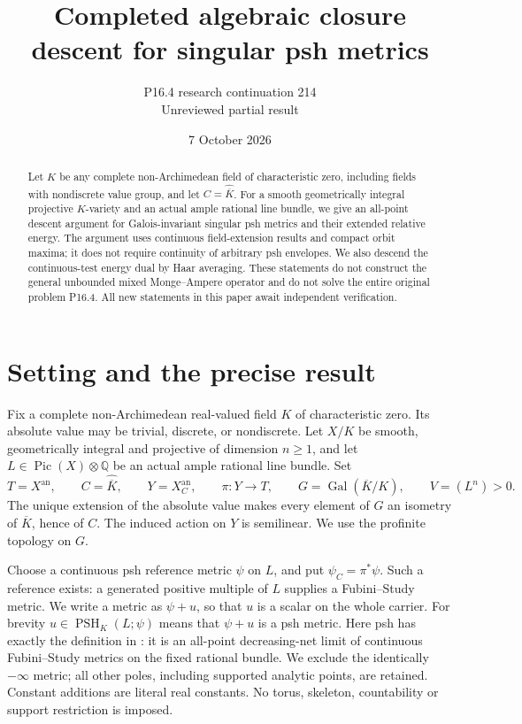 \documentclass[11pt]{article}
\title{Completed algebraic closure descent for singular psh metrics}
\author{P16.4 research continuation 214\\Unreviewed partial result}
\date{7 October 2026}
\theoremstyle{remark}
\newcommand{\PSH}{\operatorname{PSH}}
\newcommand{\an}{\mathrm{an}}
\newcommand{\Gal}{\operatorname{Gal}}
\begin{document}
\maketitle

\begin{abstract}
Let $K$ be any complete non-Archimedean field of characteristic zero,
including fields with nondiscrete value group, and let
$C=\widehat{\overline K}$. For a smooth geometrically integral projective
$K$-variety and an actual ample rational line bundle, we give an
all-point descent argument for Galois-invariant singular psh metrics
and their extended relative energy. The argument uses continuous
field-extension results and compact orbit maxima; it does not require
continuity of arbitrary psh envelopes. We also descend the
continuous-test energy dual by Haar averaging. These statements do not
construct the general unbounded mixed Monge--Ampere operator and do
not solve the entire original problem P16.4. All new statements in this
paper await independent verification.
\end{abstract}

\section{Setting and the precise result}

Fix a complete non-Archimedean real-valued field $K$ of characteristic
zero. Its absolute value may be trivial, discrete, or nondiscrete.
Let $X/K$ be smooth, geometrically integral and projective of dimension
$n\geq 1$, and let $L\in\operatorname{Pic}(X)\otimes\mathbb Q$ be an
actual ample rational line bundle. Set
\[
 T=X^{\an},\qquad C=\widehat{\overline K},\qquad
 Y=X_C^{\an},\qquad \pi:Y\longrightarrow T,\qquad
 G=\Gal(\overline K/K),\qquad V=(L^n)>0.
\]
The unique extension of the absolute value makes every element of $G$
an isometry of $\overline K$, hence of $C$. The induced action on $Y$
is semilinear. We use the profinite topology on $G$.

Choose a continuous psh reference metric $\psi$ on $L$, and put
$\psi_C=\pi^*\psi$. Such a reference exists: a generated positive
multiple of $L$ supplies a Fubini--Study metric. We write a metric as
$\psi+u$, so that $u$ is a scalar on the whole carrier. For brevity
$u\in\PSH_K(L;\psi)$ means that $\psi+u$ is a psh metric.
Here psh has exactly the definition in \cite[Definition 7.2]{BE}:
it is an all-point decreasing-net limit of continuous Fubini--Study
metrics on the fixed rational bundle. We exclude the identically
$-\infty$ metric; all other poles, including supported analytic points,
are retained. Constant additions are literal real constants. No torus,
skeleton, countability or support restriction is imposed.
\end{document}
